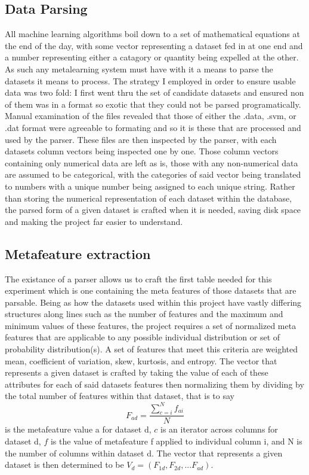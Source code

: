 \subsection{Data Parsing}
All machine learning algorithms boil down to a set of mathematical equations at the end of the day, with
some vector representing a dataset fed in at one end and a number representing either a catagory or quantity
being expelled at the other. As such any metalearning system must have with it a means to parse the
datasets it means to process. The strategy I employed in order to ensure usable data was two fold: I first
went thru the set of candidate datasets and ensured non of them was in a format so exotic that they could
not be parsed programatically. Manual examination of the files revealed that those of either the .data,
.svm, or .dat format were agreeable to formating and so it is these that are processed and used by the
parser. These files are then inspected by the parser, with each datasets column vectors being inspected one
by one. Those column vectors containing only numerical data are left as is, those with any non-numerical
data are assumed to be categorical, with the categories of said vector being translated to numbers with a
unique number being assigned to each unique string. Rather than storing the numerical representation of
each dataset within the database, the parsed form of a given dataset is crafted when it is needed, saving
disk space and making the project far easier to understand.

\subsection{Metafeature extraction}
The existance of a parser allows us to craft the first table needed for this experiment which is one
containing the meta features of those datasets that are parsable. Being as how the datasets used within
this project have vastly differing structures along lines such as the number of features and the maximum and minimum values of these features, the project requires a set of normalized meta features that are applicable
to any possible individual distribution or set of probability distribution(s). A set of  features that meet
this criteria are weighted mean, coefficient of variation, skew, kurtosis, and entropy. The vector that
represents a given dataset is crafted by taking the value of each of these attributes for each of said
datasets features then normalizing them by dividing by the total number of features within that dataset,
that is to say $$F_{ad} = \frac{\sum_{c=i}^{N}f_{ai}}{N}$$ is the metafeature value a for dataset d, $c$ is an
iterator across columns for dataset d, $f$ is the value of metafeature f applied to individual column i,
and N is the number of columns within dataset d. The vector that represents a given dataset is then
determined to be $V_d = (F_{1d}, F_{2d},...F_{ad})$.

